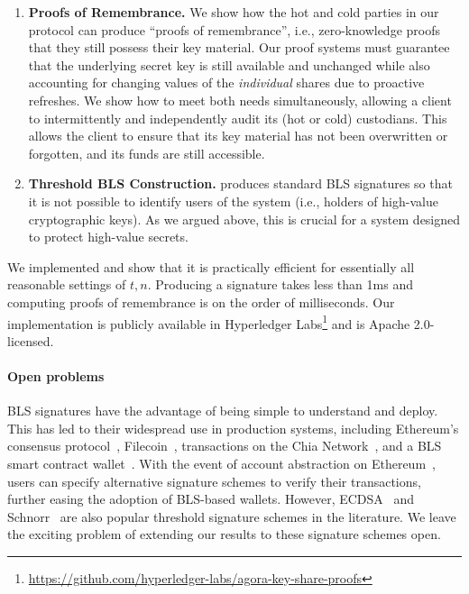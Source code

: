 \begin{enumerate}
    \item \textbf{Proofs of Remembrance.}
    We show how the hot and cold parties in our protocol can produce ``proofs of remembrance'', i.e., zero-knowledge proofs that they still possess their key material. Our proof systems must guarantee that the underlying secret key is still available and unchanged while also accounting for changing values of the \emph{individual} shares due to proactive refreshes. We show how to meet both needs simultaneously, allowing a client to intermittently and independently audit its (hot or cold) custodians. This allows the client to ensure that its key material has not been overwritten or forgotten, and its funds are still accessible.

    \item \textbf{Threshold BLS Construction.} \sysname produces standard BLS signatures so that it is not possible to identify users of the system (i.e., holders of high-value cryptographic keys). As we argued above, this is crucial for a system designed to protect high-value secrets.
\end{enumerate}

We implemented \sysname and show that it is practically efficient for essentially all reasonable settings of $t, n$. Producing a signature takes less than 1ms and computing proofs of remembrance is on the order of milliseconds. Our implementation is publicly available in Hyperledger Labs\footnote{\url{https://github.com/hyperledger-labs/agora-key-share-proofs}} and is Apache 2.0-licensed. 

\paragraph{Open problems} BLS signatures have the advantage of being simple to understand and deploy. This has led to their widespread use in production systems, including Ethereum's consensus protocol~\cite[\S2.9.1]{eth2book}, Filecoin~\cite{filecoin-spec}, transactions on the Chia Network~\cite{chia-bls}, and a BLS smart contract wallet~\cite{bls-wallet}. With the event of account abstraction on Ethereum~\cite{account-abstraction}, users can specify alternative signature schemes to verify their transactions, further easing the adoption of BLS-based wallets.  However,  ECDSA~\cite{EPRINT:GenGolNar16,SP:DKLs18,CCS:LinNof18,CCS:GenGol18,EPRINT:AumHamShl20,EPRINT:GKSS20,EPRINT:DJNPO20,CCS:CGGMP20,PKC:CCLST20,EPRINT:CCLST21,CANS:Pettit21,SP:ANOSS22} and Schnorr~\cite{SAC:KomGol20,C:BCKMTZ22,EPRINT:BatLonMen22} are also popular threshold signature schemes in the literature. We leave the exciting problem of extending our results to these signature schemes open. %